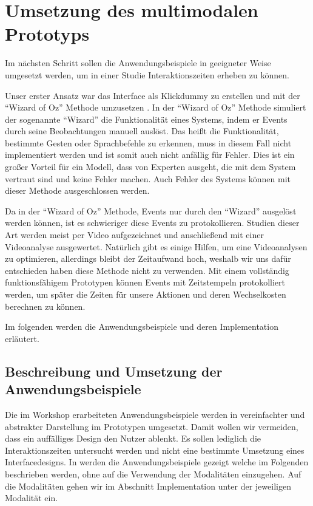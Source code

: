 \chapter[Multimodaler Prototyp]{Umsetzung des multimodalen Prototyps}\label{cha:Prototyp}
Im nächsten Schritt sollen die Anwendungsbeispiele in geeigneter Weise umgesetzt werden, um in einer Studie Interaktionszeiten erheben zu können. 

Unser erster Ansatz war das Interface als Klickdummy zu erstellen und mit der "`Wizard of Oz"' Methode umzusetzen \citep{salber1993applying}. 
In der "`Wizard of Oz"' Methode simuliert der sogenannte "`Wizard"' die Funktionalität eines Systems, indem er Events durch seine Beobachtungen manuell auslöst. 
Das heißt die Funktionalität, bestimmte Gesten oder Sprachbefehle zu erkennen, muss in diesem Fall nicht implementiert werden und ist somit auch nicht anfällig für Fehler. 
Dies ist ein großer Vorteil für ein Modell, dass von Experten ausgeht, die mit dem System vertraut sind und keine Fehler machen. 
Auch Fehler des Systems können mit dieser Methode ausgeschlossen werden. 

Da in der "`Wizard of Oz"' Methode, Events nur durch den "`Wizard"' ausgelöst werden können, ist es schwieriger diese Events zu protokollieren. 
Studien dieser Art werden meist per Video aufgezeichnet und anschließend mit einer Videoanalyse ausgewertet. 
Natürlich gibt es einige Hilfen, um eine Videoanalysen zu optimieren, allerdings bleibt der Zeitaufwand hoch, weshalb wir uns dafür entschieden haben diese Methode nicht zu verwenden. 
Mit einem vollständig funktionsfähigem Prototypen können Events mit Zeitstempeln protokolliert werden, um später die Zeiten für unsere Aktionen und deren Wechselkosten berechnen zu können. 

Im folgenden werden die Anwendungsbeispiele und deren Implementation erläutert.

\section[Anwendungsbeispiele]{Beschreibung und Umsetzung der Anwendungsbeispiele}
Die im Workshop erarbeiteten Anwendungsbeispiele werden in vereinfachter und abstrakter Darstellung im Prototypen umgesetzt. 
Damit wollen wir vermeiden, dass ein auffälliges Design den Nutzer ablenkt. 
Es sollen lediglich die Interaktionszeiten untersucht werden und nicht eine bestimmte Umsetzung eines Interfacedesigns. 
In  werden die Anwendungsbeispiele gezeigt welche im Folgenden beschrieben werden, ohne auf die Verwendung der Modalitäten einzugehen. 
Auf die Modalitäten gehen wir im Abschnitt Implementation unter der jeweiligen Modalität ein. 

